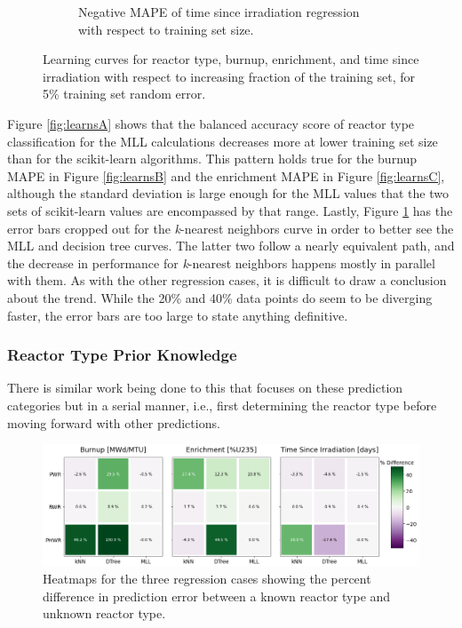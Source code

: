\begin{figure}[!htb]
\begin{subfigure}[b]{0.49\textwidth}
    \caption{Negative \gls{MAPE} of time since irradiation regression with 
             respect to training set size.}
    \label{fig:learnsD}
  \end{subfigure}
  \caption{Learning curves for reactor type, burnup, enrichment, and time 
           since irradiation with respect to increasing fraction of the 
           training set, for 5\% training set random error.}
  \label{fig:learns}
\end{figure}

Figure \ref{fig:learnsA} shows that the balanced accuracy score of reactor type
classification for the \gls{MLL} calculations decreases more at lower training
set size than for the scikit-learn algorithms.  This pattern holds true for the
burnup \gls{MAPE} in Figure \ref{fig:learnsB} and the enrichment \gls{MAPE} in
Figure \ref{fig:learnsC}, although the standard deviation is large enough for
the \gls{MLL} values that the two sets of scikit-learn values are encompassed
by that range. Lastly, Figure \ref{fig:learnsD} has the error bars cropped out
for the \textit{k}-nearest neighbors curve in order to better see the \gls{MLL}
and decision tree curves. The latter two follow a nearly equivalent path, and
the decrease in performance for \textit{k}-nearest neighbors happens mostly in
parallel with them. As with the other regression cases, it is difficult to draw
a conclusion about the trend. While the 20\% and 40\% data points do seem to be
diverging faster, the error bars are too large to state anything definitive.

\subsubsection{Reactor Type Prior Knowledge}

There is similar work being done  to this that focuses
on these prediction categories but in a serial manner, i.e., first determining
the reactor type before moving forward with other predictions.

\begin{figure}[!htb]
  \centering
  \includegraphics[width=\textwidth]{./chapters/exp1/rxtr-type_known-unknown_diff.png}
  \caption{Heatmaps for the three regression cases showing the percent 
           difference in prediction error between a known reactor type 
           and unknown reactor type.}
  \label{fig:knownrxtr}
\end{figure}

